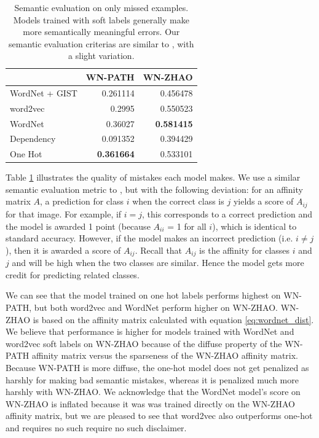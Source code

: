 \begin{table}[!tb]
    \centering
    \begin{tabular}{lrr}
         & WN-PATH & WN-ZHAO\\
        \hline
        WordNet + GIST & 0.261114 & 0.456478\\
        word2vec & 0.2995 & 0.550523\\
        WordNet & 0.36027 & \textbf{0.581415}\\
        Dependency & 0.091352 & 0.394429\\
        One Hot & \textbf{0.361664} & 0.533101\\
    \end{tabular}
  \caption{
      Semantic evaluation on only missed examples. Models trained
      with soft labels generally make more semantically meaningful errors. Our
      semantic evaluation criterias are similar to \cite{zhao2011large}, with a
      slight variation.
  }
  \label{tbl:semantic_misses}
\end{table}

Table \ref{tbl:semantic_misses} illustrates the quality of mistakes each model
makes. We use a similar semantic evaluation metric to \cite{zhao2011large}, but
with the following deviation: for an affinity matrix $A$, a prediction for class
$i$ when the correct class is $j$ yields a score of $A_{ij}$ for that image. For
example, if $i = j$, this corresponds to a correct prediction and the model is
awarded 1 point (because $A_{ii}$ = 1 for all $i$), which is identical to
standard accuracy. However, if the model makes an incorrect prediction (i.e. $i
\neq j$), then it is awarded a score of $A_{ij}$. Recall that $A_{ij}$ is the
affinity for classes $i$ and $j$ and will be high when the two classes are
similar. Hence the model gets more credit for predicting related classes.

We can see that the model trained on one hot labels performs highest on WN-PATH,
but both word2vec and WordNet perform higher on WN-ZHAO. WN-ZHAO is based on the
affinity matrix calculated with equation \ref{eq:wordnet_dist}. We believe that
performance is higher for models trained with WordNet and word2vec soft labels
on WN-ZHAO because of the diffuse property of the WN-PATH affinity matrix versus
the sparseness of the WN-ZHAO affinity matrix. Because WN-PATH is more diffuse,
the one-hot model does not get penalized as harshly for making bad semantic
mistakes, whereas it is penalized much more harshly with WN-ZHAO.  We
acknowledge that the WordNet model's score on WN-ZHAO is inflated because it was
was trained directly on the WN-ZHAO affinity matrix, but we are pleased to see
that word2vec also outperforms one-hot and requires no such require no such
disclaimer.

